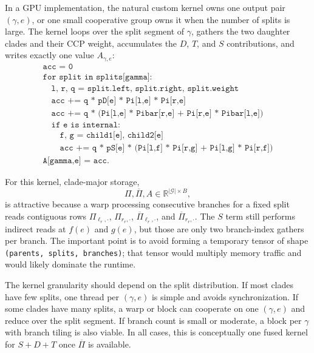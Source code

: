 \documentclass{article}
\newcommand{\1}{\mathbf{1}}
\newcommand{\Rbb}{\mathbb{R}}
\newcommand{\Pibar}{\overline{\Pi}}
\begin{document}
In a GPU implementation, the natural custom kernel owns one output pair $(\gamma,e)$, or one small cooperative group owns it when the number of splits is large. The kernel loops over the split segment of $\gamma$, gathers the two daughter clades and their CCP weight, accumulates the $D$, $T$, and $S$ contributions, and writes exactly one value $A_{\gamma,e}$:
\[
\begin{array}{l}
\texttt{acc = 0}\\
\texttt{for split in splits[gamma]:}\\
\quad \texttt{l, r, q = split.left, split.right, split.weight}\\
\quad \texttt{acc += q * pD[e] * Pi[l,e] * Pi[r,e]}\\
\quad \texttt{acc += q * (Pi[l,e] * Pibar[r,e] + Pi[r,e] * Pibar[l,e])}\\
\quad \texttt{if e is internal:}\\
\quad\quad \texttt{f, g = child1[e], child2[e]}\\
\quad\quad \texttt{acc += q * pS[e] * (Pi[l,f] * Pi[r,g] + Pi[l,g] * Pi[r,f])}\\
\texttt{A[gamma,e] = acc.}
\end{array}
\]

For this kernel, clade-major storage,
\[
    \Pi,\Pibar,A\in\Rbb^{|\mathcal{G}|\times B},
\]
is attractive because a warp processing consecutive branches for a fixed split reads contiguous rows $\Pi_{\ell_r,\cdot}$, $\Pi_{r_r,\cdot}$, $\Pibar_{\ell_r,\cdot}$, and $\Pibar_{r_r,\cdot}$. The $S$ term still performs indirect reads at $f(e)$ and $g(e)$, but those are only two branch-index gathers per branch. The important point is to avoid forming a temporary tensor of shape \texttt{(parents, splits, branches)}; that tensor would multiply memory traffic and would likely dominate the runtime.

The kernel granularity should depend on the split distribution. If most clades have few splits, one thread per $(\gamma,e)$ is simple and avoids synchronization. If some clades have many splits, a warp or block can cooperate on one $(\gamma,e)$ and reduce over the split segment. If branch count is small or moderate, a block per $\gamma$ with branch tiling is also viable. In all cases, this is conceptually one fused kernel for $S+D+T$ once $\Pibar$ is available.
\end{document}
